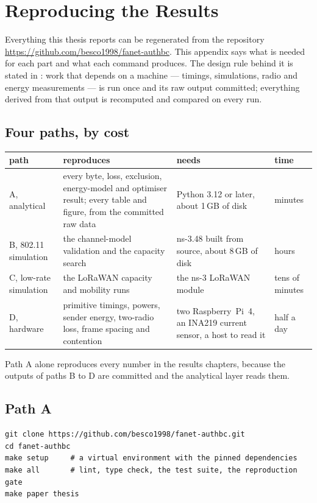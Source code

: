 \chapter{Reproducing the Results}\label{app:repro}

Everything this thesis reports can be regenerated from the repository
\url{https://github.com/besco1998/fanet-authbc}. This appendix says what is needed for each
part and what each command produces. The design rule behind it is stated in
: work that depends on a machine --- timings, simulations, radio and
energy measurements --- is run once and its raw output committed; everything derived from that
output is recomputed and compared on every run.

\section{Four paths, by cost}

{\small
\noindent\begin{tabularx}{\textwidth}{@{}l Y Y l@{}}
\toprule
path & reproduces & needs & time \\
\midrule
A, analytical & every byte, loss, exclusion, energy-model and optimiser result; every table and
figure, from the committed raw data & Python 3.12 or later, about 1\,GB of disk & minutes \\
B, 802.11 simulation & the channel-model validation and the capacity search &
ns-3.48 built from source, about 8\,GB of disk & hours \\
C, low-rate simulation & the LoRaWAN capacity and mobility runs & the ns-3 LoRaWAN module &
tens of minutes \\
D, hardware & primitive timings, powers, sender energy, two-radio loss, frame spacing and contention &
two Raspberry~Pi~4, an INA219 current sensor, a host to read it & half a day \\
\bottomrule
\end{tabularx}
}

\noindent Path A alone reproduces every number in the results chapters, because the outputs
of paths B to D are committed and the analytical layer reads them.

\section{Path A}

\begin{verbatim}
git clone https://github.com/besco1998/fanet-authbc.git
cd fanet-authbc
make setup     # a virtual environment with the pinned dependencies
make all       # lint, type check, the test suite, the reproduction gate
make paper thesis
\end{verbatim}

